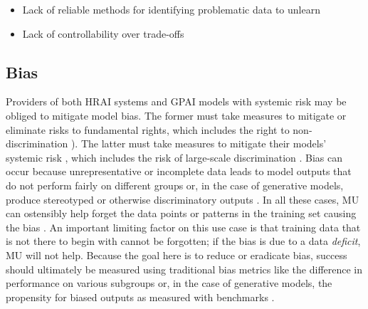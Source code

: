 \vspace{1em}

\begin{tcolorbox}[colback=red!10,colframe=black!50,title=Open Problems]
\begin{itemize}[leftmargin=0pt]
    \item Lack of reliable methods for identifying problematic data to unlearn
    \item Lack of controllability over trade-offs
\end{itemize}
\end{tcolorbox}


\vspace{1em}
\subsection{Bias} 

Providers of both HRAI systems and GPAI models with systemic risk may be obliged to mitigate model bias. The former must take measures to mitigate or eliminate risks to fundamental rights, which includes the right to non-discrimination \citep[Arts. 9]{european_union_ai_act_2024}). The latter must take measures to mitigate their models' systemic risk \citep[Art. 55]{european_union_ai_act_2024}, which includes the risk of large-scale discrimination \cite{gpai_code_2024}. Bias can occur because unrepresentative or incomplete data leads to model outputs that do not perform fairly on different groups or, in the case of generative models, produce stereotyped or otherwise discriminatory outputs \citep{sci6010003}. In all these cases, MU can ostensibly help forget the data points or patterns in the training set causing the bias \citep{pedregosa2023machineunlearning, neel2024machineunlearning, sai2024machineunlearning, keskpaik2024machine, chen2023unlearnwantforgetefficient, lucki2024adversarialperspectivemachineunlearning}. An important limiting factor on this use case is that training data that is not there to begin with cannot be forgotten; if the bias is due to a data \textit{deficit}, MU will not help. Because the goal here is to reduce or eradicate bias, success should ultimately be measured using traditional bias metrics like the difference in performance on various subgroups \citep{dealcala2023measuringbiasaimodels} or, in the case of generative models, the propensity for biased outputs as measured with benchmarks \citep{parrish2022bbqhandbuiltbiasbenchmark}.

